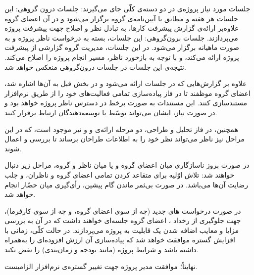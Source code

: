جلسات مورد نیاز پروژه‌ی \PRJN{} در دو دسته‌ی کلّی جای می‌گیرند:
 جلسات درون گروهی: این جلسات هر هفته و مطابق با آیین‌نامه‌ی گروه برگزار می‌شود و در آن اعضای گروه علاوه‌بر ارائه‌ی گزارش پیشرفت کارها، به تبادل نظر و اصلاح جهت پیشرفت پروژه می‌پردازند.
 جلسات برون‌گروهی: این جلسات، بسته به درخواست ناظر پروژه و به صورت ماهیانه برگزار می‌شود. در این جلسات، مدیریت گروه گزارشی از پیشرفت پروژه ارائه می‌کند، و با توجه به بازخورد ناظر، مسیر انجام پروژه را اصلاح می‌کند. نتیجه‌ی این جلسات در جلسات درون‌گروهی منعکس خواهد شد.

علاوه بر گزارش‌هایی که در جلسات ارائه می‌شود و در بخش قبل به آن‌ها اشاره شد، اعضای گروه موظفند تا در فاز پیاده‌سازی تمامی فعالیت‌های خود را از طریق نرم‌افزار  مستندسازی کنند. این مستندات به صورت برخط در دسترس ناظر پروژه خواهد بود و در صورت نیاز، ایشان می‌تواند توسّط  با توسعه‌دهندگان ارتباط برقرار کنند.

همچنین، در فاز تحلیل و طراحی، دو مرحله ارائه‌ی  و  و  نیز موجود است، که در این مراحل نیز ناظر می‌تواند نظر خود را به اطلاعات طراحان برساند تا بررسی و اعمال شوند.

در صورت بروز ناسازگاری میان اعضای گروه و یا میان ناظر و گروه، مراحل زیر دنبال خواهند شد:
 تلاش اوّلیه برای متقاعد کردن تمامی اعضای گروه و ناظران، و جلب رضایت آن‌ها می‌باشد.
 در صورت بی‌ثمر ماندن گام پیشین، رأی‌گیری میان حضّار انجام خواهد شد.

در صورت درخواست های جدید (چه از سوی اعضای گروه، و چه از سوی کارفرما)، جهت جلوگیری از رخداد ، اعضای گروه جلسه‌ای خواهند داشت که در آن به بررسی مزایا و معایب اضافه شدن یک قابلیت به پروژه می‌پردازند. در حالت کلّی، زمانی با افزایش گستره موافقت خواهد شد که پیاده‌سازی آن ارزش افزوده‌ای را به‌همراه داشته باشد و شرایط پروژه (مانند بودجه و زمان‌بندی) را نقض نکند.

نهایتاً؛ موافقت مدیر پروژه جهت تغییر گستره‌ی نرم‌افزار الزامیست.


